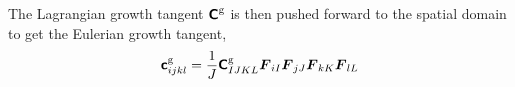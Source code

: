 \documentclass[10pt,letterpaper,oneside]{report}
\newcommand{\ten}[1]{\mbox{\boldmath $#1$}{}}
\newcommand{\tenf}[1]{\mbox{{\sffamily{\bfseries {#1}}}}}
\newcommand{\scas}[1]{\mbox{{\scriptsize{${\rm{#1}}$}}}{}}
\newcommand{\tens}[1]{\mbox{\boldmath{\scriptsize{$#1$}}}{}}
\begin{document}
The Lagrangian growth tangent $\tenf{C}^{\scas{g}}$ is then pushed forward to the spatial domain to get the Eulerian growth tangent,
\begin{align}
\tenf{c}^{\scas{g}}_{ijkl} 
={}& \frac{1}{J} \tenf{C}^{\scas{g}}_{IJKL} \ten{F}_{iI} \ten{F}_{jJ} \ten{F}_{kK} \ten{F}_{lL} 
\\

\end{align}
\end{document}
